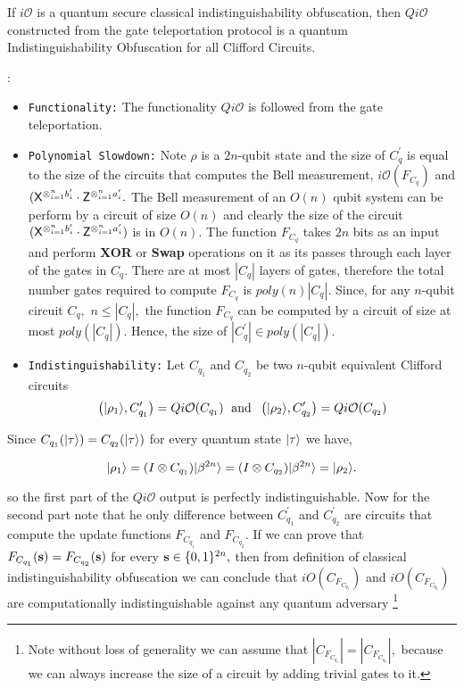 \begin{theorem}
If $i\mathcal{O}$ is a quantum secure classical indistinguishability obfuscation, then $Qi\mathcal{O}$ constructed from the gate teleportation protocol is a quantum Indistinguishability Obfuscation for all Clifford Circuits.
\end{theorem}


:
\begin{itemize}
\item  {\tt Functionality:} The functionality $Qi\mathcal{O}$ is followed from the gate teleportation.
\item {\tt Polynomial Slowdown:} Note $\rho$ is a $2n$-qubit state  and the size of $C_q^\prime$ is equal to the size of the circuits that computes the Bell measurement,  $i\mathcal{O}(F_{C_q})$ and $({\sf X}^{\otimes_{i=1}^{n} b_{i}^\prime} \cdot {\sf Z}^{\otimes_{i=1}^{n} a_{i}^\prime}.$ The Bell measurement of an $O(n)$ qubit system can be perform by a circuit of size $O(n)$ and clearly the size of the circuit  $({\sf X}^{\otimes_{i=1}^{n} b_{i}^\prime} \cdot {\sf Z}^{\otimes_{i=1}^{n} a_{i}^\prime})$ is in $O(n).$ The function $F_{C_q}$ takes  $2n$ bits as an input and perform {\bf XOR} or {\bf Swap} operations on it as its passes through each layer of the gates in $C_{q}.$ There are at most $|C_q|$ layers of gates, therefore the total number gates  required to compute $F_{C_q}$ is $poly(n)|C_q|.$ Since, for any $n$-qubit circuit $C_q,$ $n\leq |C_q|,$ the function $F_{C_q}$ can be computed by a circuit  of size at most $poly(|C_{q}|).$  Hence, the size of $|C_q^\prime | \in poly(|C_q|).$


\item  {\tt Indistinguishability:} Let $C_{q_1}$ and $C_{q_2}$ be two $n$-qubit equivalent Clifford circuits
$$\left({\lvert}\rho_1\rangle,C_{q_1}^\prime \right)= Qi\mathcal{O}(C_{q_1})
\;\mbox{ and }\;\left({\lvert}\rho_2\rangle,C_{q_2}^\prime \right)= Qi\mathcal{O}(C_{q_2}) $$
\end{itemize}

Since $C_{q_1}({\lvert}\tau\rangle)=C_{q_2}({\lvert}\tau\rangle)$ for every quantum state ${\lvert}\tau\rangle$ we have,

$${\lvert}\rho_1\rangle=(I\otimes C_{q_1}) {\lvert}\beta^{2n}\rangle=(I\otimes C_{q_2}) {\lvert}\beta^{2n}\rangle={\lvert}\rho_2\rangle.$$

so the first part of the $Qi\mathcal{O}$ output is perfectly indistinguishable.  Now for the second  part note that he only difference between  $C_{q_1}^\prime$ and $C_{q_2}^\prime$ are circuits that compute the update functions $F_{C_{q_1}}$ and  $F_{C_{q_2}}.$ If we can prove that $F_{C_{q_1}}({\bf s})=F_{C_{q_2}}({\bf s})$ for every  ${\bf s}\in\{0,1\}^{2n},$ then from definition of classical indistinguishability obfuscation we can conclude that  $iO(C_{F_{C_{q_2}}})$ and $iO(C_{F_{C_{q_2}}})$
are computationally indistinguishable against any quantum adversary \footnote{Note without loss of generality we can assume that $|C_{F_{C_{q_1}}}|=|C_{F_{C_{q_2}}}|,$ because we can always increase the size of a circuit by adding trivial gates to it. }


